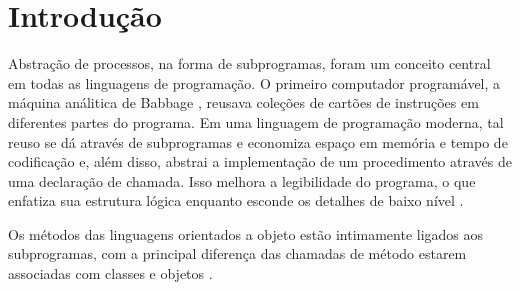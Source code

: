 
\section{Introdução} 
\label{sec:introducao}
Abstração de processos, na forma de subprogramas, foram 
um conceito central em todas as linguagens de programação.
O primeiro computador programável, a máquina análitica de Babbage \cite{babbage1910babbage},
reusava coleções de cartões de instruções em diferentes partes do programa.
Em uma linguagem de programação moderna, tal reuso se dá através de subprogramas
e economiza espaço em memória e tempo de codificação e, além disso,
abstrai a implementação de um procedimento através de uma declaração de chamada.
Isso melhora a legibilidade do programa, o que enfatiza sua estrutura lógica
enquanto esconde os detalhes de baixo nível \cite{sebesta}.

Os métodos das linguagens orientados a objeto estão intimamente ligados 
aos subprogramas, com a principal diferença das chamadas de método
estarem associadas com classes e objetos \cite{sebesta}.

